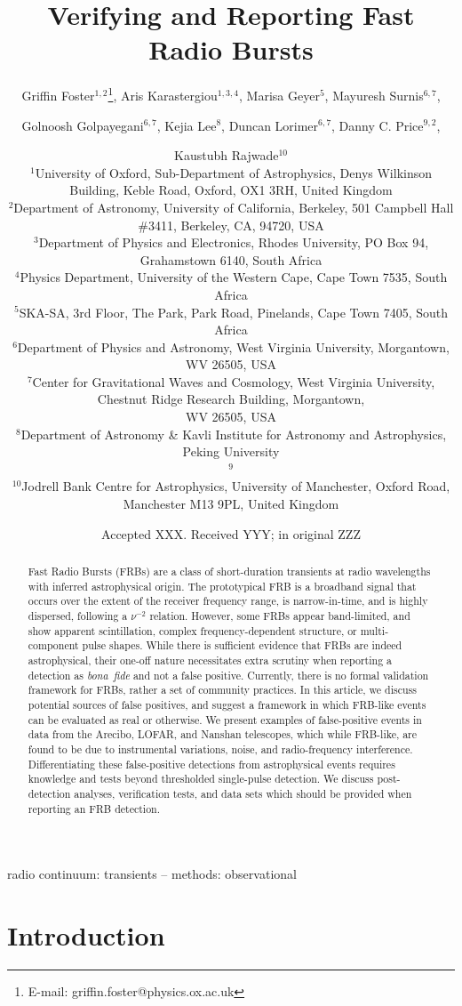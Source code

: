 \documentclass[a4paper,fleqn,usenatbib]{mnras}
\title[FRB Verification]{Verifying and Reporting Fast Radio Bursts}
\author[G. Foster et al.]{Griffin Foster$^{1,2}$\thanks{E-mail: griffin.foster@physics.ox.ac.uk},
Aris Karastergiou$^{1,3,4}$,
Marisa Geyer$^{5}$,
Mayuresh Surnis$^{6,7}$,
\and
Golnoosh Golpayegani$^{6,7}$,
Kejia Lee$^{8}$,
Duncan Lorimer$^{6,7}$,
Danny C. Price$^{9,2}$,
\and
Kaustubh Rajwade$^{10}$
\\
$^{1}$University of Oxford, Sub-Department of Astrophysics, Denys Wilkinson Building, Keble Road, Oxford, OX1 3RH, United Kingdom\\
$^{2}$Department of Astronomy, University of California, Berkeley, 501 Campbell
Hall \#3411, Berkeley, CA, 94720, USA\\
$^{3}$Department of Physics and Electronics, Rhodes University,
    PO Box 94, Grahamstown 6140, South Africa\\
$^{4}$Physics Department, University of the Western Cape,
    Cape Town 7535, South Africa\\
$^{5}$SKA-SA, 3rd Floor, The Park, Park Road, Pinelands, Cape Town 7405, South Africa\\
$^{6}$Department of Physics and Astronomy, West Virginia University, Morgantown, WV 26505, USA\\
$^{7}$Center for Gravitational Waves and Cosmology, West Virginia University, Chestnut Ridge Research Building, Morgantown,\\ WV 26505, USA\\
$^{8}$Department of Astronomy \& Kavli Institute for Astronomy and Astrophysics, Peking University\\
$^{9}$\SWIN \\
$^{10}$Jodrell Bank Centre for Astrophysics, University of Manchester, Oxford Road, Manchester M13 9PL, United Kingdom\\
}
\date{Accepted XXX. Received YYY; in original ZZZ}
\begin{document}
\label{firstpage}
\pagerange{\pageref{firstpage}--\pageref{lastpage}}
\maketitle

\begin{abstract}
Fast Radio Bursts (FRBs) are a class of short-duration transients at radio
wavelengths with inferred astrophysical origin.  The prototypical FRB is a
broadband signal that occurs over the extent of the receiver frequency range, is
narrow-in-time, and is highly dispersed, following a $\nu^{-2}$ relation.
However, some FRBs appear band-limited, and show apparent scintillation, complex
frequency-dependent structure, or multi-component pulse shapes.  While there is
sufficient evidence that FRBs are indeed astrophysical, their one-off nature
necessitates extra scrutiny when reporting a detection as \emph{bona~fide} and
not a false positive. Currently, there is no formal validation framework for
FRBs, rather a set of community practices. In this article, we discuss potential
sources of false positives, and suggest a framework in which FRB-like events can
be evaluated as real or otherwise.  We present examples of false-positive events
in data from the Arecibo, LOFAR, and Nanshan telescopes, which while FRB-like,
are found to be due to instrumental variations, noise, and radio-frequency
interference.  Differentiating these false-positive detections from
astrophysical events requires knowledge and tests beyond thresholded
single-pulse detection.  We discuss post-detection analyses, verification tests,
and data sets which should be provided when reporting an FRB detection.
\end{abstract}

\begin{keywords}
radio continuum: transients -- methods: observational
\end{keywords}


\section{Introduction}
\label{sec:intro}
\end{document}
